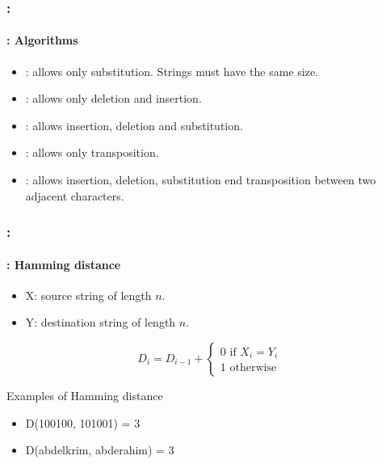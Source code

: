 \documentclass[xcolor=table]{beamer}
\begin{document}
\begin{frame}
	\frametitle{\insertshortsubtitle: \insertsection}
	\framesubtitle{\insertsubsection: Algorithms}

	\begin{itemize}
		\item {}: allows only substitution. Strings must have the same size. 
		\item {}: allows only deletion and insertion.
		\item {}: allows insertion, deletion and substitution.
		\item {}: allows only transposition.
		\item {}: allows insertion, deletion, substitution end transposition between two  adjacent characters.
	\end{itemize}

\end{frame}


\begin{frame}
	\frametitle{\insertshortsubtitle: \insertsection}
	\framesubtitle{\insertsubsection: Hamming distance}
	
	\begin{itemize}
		\item X: source string of length $n$.
		\item Y: destination string of length $n$.
	\end{itemize}
	
	\[
	D_{i} = D_{i-1} + 
	\begin{cases}
	0 \text{ if } X_i = Y_i\\
	1 \text{ otherwise}
	\end{cases}
	\]
	
	\begin{exampleblock}{Examples of Hamming distance}
		\begin{itemize}
			\item D(100100, 101001) = 3
			\item D(abdelkrim, abderahim) = 3
		\end{itemize}
	\end{exampleblock}
	
\end{frame}
\end{document}
